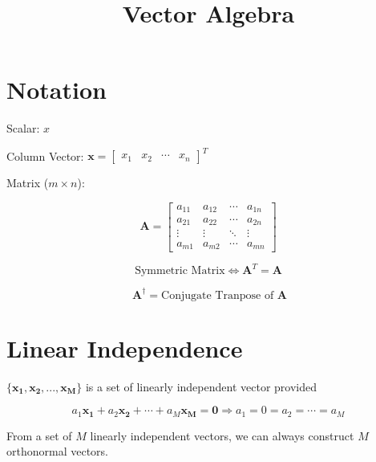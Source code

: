 \documentclass[fleqn]{article}
\title{Vector Algebra}
\author{}
\date{}
\newcommand{\zerodisplayskip}{
	\setlength{\abovedisplayskip}{0pt}%
	\setlength{\belowdisplayskip}{0pt}%
	\setlength{\abovedisplayshortskip}{0pt}%
	\setlength{\belowdisplayshortskip}{0pt}%
	\setlength{\mathindent}{0pt}}
\begin{document}
	\offinterlineskip
	\setlength{\lineskip}{12pt}
	\zerodisplayskip
	\maketitle
	
	\section{Notation}
		
	Scalar: $x$

	Column Vector: $\mathbf{x} = \begin{bmatrix}x_1 & x_2 & \cdots & x_n \end{bmatrix}^T$
		
	Matrix ($m \times n$):
		
	\begin{equation*}
		\mathbf{A} = \begin{bmatrix}
			a_{11} & a_{12} & \cdots & a_{1n}\\
			a_{21} & a_{22} & \cdots & a_{2n}\\
			\vdots & \vdots & \ddots & \vdots\\
			a_{m1} & a_{m2} & \cdots & a_{mn}
		\end{bmatrix}
	\end{equation*}
		
	\begin{equation*}
		\text{Symmetric Matrix} \Leftrightarrow \mathbf{A}^T = \mathbf{A}
	\end{equation*}
			
	\begin{equation*}\
		\mathbf{A}^{\dag} = \text{Conjugate Tranpose of } \mathbf{A}
	\end{equation*}
	
	\section{Linear Independence}
	
	$\{\mathbf{x_1}, \mathbf{x_2},...,\mathbf{x_M}\}$ is a set of linearly independent vector provided
	
	\begin{equation*}
		a_1\mathbf{x_1} + a_2\mathbf{x_2} + \cdots + a_M\mathbf{x_M} = \mathbf{0} \Rightarrow a_1 = 0 = a_2 = \cdots = a_M 
	\end{equation*}
	
	From a set of $M$ linearly independent vectors, we can always construct $M$ orthonormal vectors.
	
\end{document}
